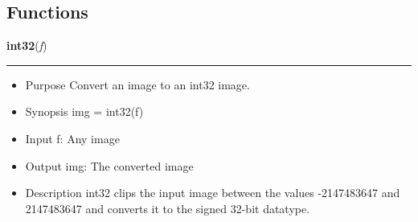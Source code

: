 
  \subsection{Functions}

    \label{multireg:num_pymorph:int32}
    \vspace{0.5ex}

    \begin{boxedminipage}{\textwidth}

    \raggedright \textbf{int32}(\textit{f})

    \vspace{-1.5ex}

    \rule{\textwidth}{0.5\fboxrule}
    \begin{itemize}
    \setlength{\parskip}{0.6ex}
      \item Purpose Convert an image to an int32 image.

      \item Synopsis img = int32(f)

      \item Input f: Any image

      \item Output img: The converted image

      \item Description int32 clips the input image between the values 
        -2147483647 and 2147483647 and converts it to the signed 32-bit 
        datatype.

    \end{itemize}

    \vspace{1ex}

    \end{boxedminipage}

    \label{multireg:num_pymorph:mmadd4dil}
    \vspace{0.5ex}

